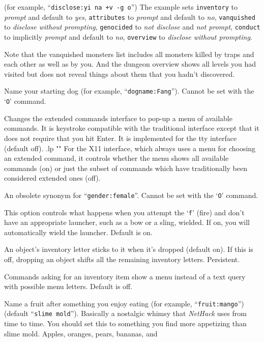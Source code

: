 (for example, ``{\tt disclose:yi na +v -g o}'')
The example sets
{\tt inventory} to {\it prompt\/} and default to {\it yes\/},
{\tt attributes} to {\it prompt\/} and default to {\it no\/},
{\tt vanquished} to {\it disclose without prompting\/},
{\tt genocided} to {\it not disclose\/} and {\it not prompt\/},
{\tt conduct} to implicitly {\it prompt\/} and default to {\it no\/},
{\tt overview} to {\it disclose without prompting\/}.

Note that the vanquished monsters list includes all monsters killed by
traps and each other as well as by you.
And the dungeon overview shows all levels you had visited but does not
reveal things about them that you hadn't discovered.
\item[\ib{dogname}]
Name your starting dog (for example, ``{\tt dogname:Fang}'').
Cannot be set with the `{\tt O}' command.
\item[\ib{extmenu}]
Changes the extended commands interface to pop-up a menu of available commands.
It is keystroke compatible with the traditional interface except that it does
not require that you hit Enter.
It is implemented for the tty interface (default off).
.lp ""
For the X11 interface, which always uses a menu for choosing an extended
command, it controls whether the menu shows all available commands (on)
or just the subset of commands which have traditionally been considered
extended ones (off).
\item[\ib{female}]
An obsolete synonym for ``{\tt gender:female}''.  Cannot be set with the
`{\tt O}' command.
\item[\ib{fireassist}]
This option controls what happens when you attempt the `{\tt f}' (fire)
and don't have an appropriate launcher, such as a bow or a sling, wielded.
If on, you will automatically wield the launcher. Default is on.
\item[\ib{fixinv}]
An object's inventory letter sticks to it when it's dropped (default on).
If this is off, dropping an object shifts all the remaining inventory letters.
Persistent.
\item[\ib{force\_invmenu}]
Commands asking for an inventory item show a menu instead of
a text query with possible menu letters. Default is off.
\item[\ib{fruit}]
Name a fruit after something you enjoy eating (for example, ``{\tt fruit:mango}'')
(default ``{\tt slime mold}''). Basically a nostalgic whimsy that
{\it NetHack\/} uses from time to time.  You should set this to something you
find more appetizing than slime mold.  Apples, oranges, pears, bananas, and
